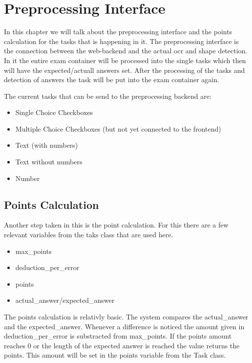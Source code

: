\author{Tadd\"aus Nauheimer}
\chapter{Preprocessing Interface}
In this chapter we will talk about the preprocessing interface and the points calculation for the tasks that is happening in it.
The preprocessing interface is the connection between the web-backend and the actual ocr and shape detection.
In it the entire exam container will be processed into the single tasks which then will have the expected/actuall answers set.
After the processing of the tasks and detection of answers the task will be put into the exam container again.

The current tasks that can be send to the preprocessing backend are:

\begin{itemize}
	\item Single Choice Checkboxes
	\item Multiple Choice Checkboxes (but not yet connected to the frontend)
	\item Text (with numbers)
	\item Text without numbers
	\item Number
\end{itemize}


\section{Points Calculation}
Another step taken in this is the point calculation.
For this there are a few relevant variables from the taks class that are used here.

\begin{itemize}
	\item max\_points
	\item deduction\_per\_error
	\item points
	\item actual\_answer/expected\_answer
\end{itemize}

The points calculation is relativly basic.
The system compares the actual\_answer and the expected\_answer. 
Whenever a difference is noticed the amount given in deduction\_per\_error is substracted from max\_points.
If the points amount reaches 0 or the length of the expected answer is reached the value returns the points.
This amount will be set in the points variable from the Task class.
